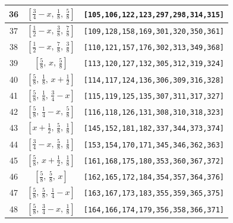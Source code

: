 \documentclass[fleqn,8pt]{jsarticle}
\begin{document}
\begin{longtable}{ccc}
36 & $\left[ \frac{3}{4} - x,\, \frac{1}{8},\, \frac{5}{8} \right]$ & {\tt [105,106,122,123,297,298,314,315]} \\ \hline
37 & $\left[ \frac{1}{2} - x,\, \frac{3}{8},\, \frac{7}{8} \right]$ & {\tt [109,128,158,169,301,320,350,361]} \\ \hline
38 & $\left[ \frac{1}{2} - x,\, \frac{7}{8},\, \frac{3}{8} \right]$ & {\tt [110,121,157,176,302,313,349,368]} \\ \hline
39 & $\left[ \frac{5}{8},\, x,\, \frac{5}{8} \right]$ & {\tt [113,120,127,132,305,312,319,324]} \\ \hline
40 & $\left[ \frac{5}{8},\, \frac{1}{8},\, x + \frac{1}{2} \right]$ & {\tt [114,117,124,136,306,309,316,328]} \\ \hline
41 & $\left[ \frac{5}{8},\, \frac{1}{8},\, \frac{3}{4} - x \right]$ & {\tt [115,119,125,135,307,311,317,327]} \\ \hline
42 & $\left[ \frac{5}{8},\, \frac{1}{4} - x,\, \frac{5}{8} \right]$ & {\tt [116,118,126,131,308,310,318,323]} \\ \hline
43 & $\left[ x + \frac{1}{2},\, \frac{5}{8},\, \frac{1}{8} \right]$ & {\tt [145,152,181,182,337,344,373,374]} \\ \hline
44 & $\left[ \frac{3}{4} - x,\, \frac{5}{8},\, \frac{1}{8} \right]$ & {\tt [153,154,170,171,345,346,362,363]} \\ \hline
45 & $\left[ \frac{5}{8},\, x + \frac{1}{2},\, \frac{1}{8} \right]$ & {\tt [161,168,175,180,353,360,367,372]} \\ \hline
46 & $\left[ \frac{5}{8},\, \frac{5}{8},\, x \right]$ & {\tt [162,165,172,184,354,357,364,376]} \\ \hline
47 & $\left[ \frac{5}{8},\, \frac{5}{8},\, \frac{1}{4} - x \right]$ & {\tt [163,167,173,183,355,359,365,375]} \\ \hline
48 & $\left[ \frac{5}{8},\, \frac{3}{4} - x,\, \frac{1}{8} \right]$ & {\tt [164,166,174,179,356,358,366,371]} \\
\end{longtable}
\renewcommand{\arraystretch}{1.2}
\end{document}
